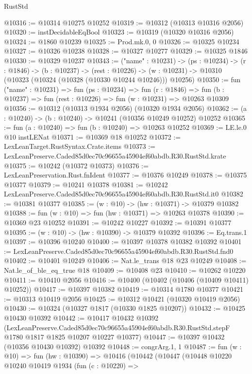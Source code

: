 \begin{lexlean}{RustStd}
\begin{coremodule}
@10316 := @10314 @10275 @10252
@10319 := @10312 (@10313 @10316 @2056)
@10320 := instDecidableEqBool
@10323 := @10319 (@10320 @10316 @2056)
@10324 := @1860 @10239
@10325 := Prod.mk.{0, 0}
@10326 := @10325 @10234
@10327 := @10326 @10238
@10328 := @10327 @10277
@10329 := @10325 @1846
@10330 := @10329 @10237
@10343 := ("name" : @10231) ->
  (ps : @10234) ->
  (r : @1846) ->
  (b : @10237) ->
  (rest : @10226) -> (w : @10231) -> @10310 (@10323 (@10324 (@10328 (@10330 @10244 @10246))) @10256)
@10350 := fun ("name" : @10231) =>
  fun (ps : @10234) =>
  fun (r : @1846) => fun (b : @10237) => fun (rest : @10226) => fun (w : @10231) => @10263 @10309
@10356 := @10312 (@10313 @1934 @2056) (@10320 @1934 @2056)
@10362 := (a : @10240) -> (b : @10240) -> @10241 (@10356 @10249 @10252) @10252
@10365 := fun (a : @10240) => fun (b : @10240) => @10263 @10252
@10369 := LE.le.{0} @10 instLENat
@10371 := @10369 @18 @10252
@10372 := LexLeanTarget.RustSyntax.Crate.items
@10373 := LexLeanPreserve.Caded85d0ec70c96655a45904ef60abdb.R30.RustStd.krate
@10375 := @10242 (@10372 @10373)
@10376 := LexLeanPreservation.Rust.fnIdent
@10377 := @10376 @10249
@10378 := @10375 @10377
@10379 := @10241 @10378
@10381 := @10242 LexLeanPreserve.Caded85d0ec70c96655a45904ef60abdb.R30.RustStd.it0
@10382 := @10381 @10377
@10385 := (w : @10) -> (hw : @10371) -> @10379 @10382
@10388 := fun (w : @10) => fun (hw : @10371) => @10263 @10378
@10390 := @10369 @23 @10252
@10391 := @10242 @10227
@10392 := @10391 @10377
@10395 := (w : @10) -> (hw : @10390) -> @10379 @10392
@10396 := Eq.trans.{1}
@10397 := @10396 @10240
@10400 := @10397 @10378 @10382 @10392
@10401 := LexLeanPreserve.Caded85d0ec70c96655a45904ef60abdb.R30.RustStd.fnd0
@10402 := @10401 @10249
@10406 := Nat.le_trans @18 @23 @10249
@10408 := Nat.le_of_ble_eq_true @18
@10409 := @10408 @23
@10410 := @10262 @10220
@10411 := @10410 @2056
@10416 := @10400 (@10402 (@10406 (@10409 @10411) @10252))
@10417 := @10397 @10382
@10419 := @10314 @1780 @10377
@10421 := @10313 @10419 @2056
@10425 := @10312 @10421 (@10320 @10419 @2056)
@10430 := @10324 (@10327 @1817 (@10330 @1825 @10207))
@10432 := @10425 @10430 @10392
@10442 := @10417
    @10432
    @10392
    (LexLeanPreserve.Caded85d0ec70c96655a45904ef60abdb.R30.RustStd.stepF
      @1780
      @1817
      @1825
      @10207
      @10227
      @10377)
@10447 := @10397 @10432 (@10356 @10430 @10392) @10392
@10448 := congrArg.{1, 1}
@10487 := fun (w : @10) =>
  fun (hw : @10390) =>
  @10416
    (@10442
      (@10447
        (@10448
          @10220
          @10240
          @10419
          @1934
          (fun (c : @10220) =>

\end{coremodule}
\end{lexlean}
